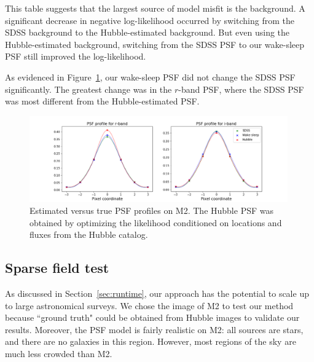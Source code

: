 This table suggests that the largest source of model misfit is the background. A significant decrease in negative log-likelihood occurred by switching from the SDSS background to the Hubble-estimated background. 
But even using the Hubble-estimated background, switching from the SDSS PSF to our wake-sleep PSF still improved the log-likelihood. 



As evidenced in Figure~\ref{fig:psf_profiles}, our wake-sleep PSF did not change the SDSS PSF significantly. The greatest change was in the $r$-band PSF, where the SDSS PSF was most different from the Hubble-estimated PSF. 

\begin{figure}[h]
    \centering
    \includegraphics[width=0.99\textwidth]{figures/psf_profiles.png}
    \caption{Estimated versus true PSF profiles on M2. The Hubble PSF was
    obtained by optimizing the likelihood conditioned on locations and fluxes
    from the Hubble catalog. }
    \label{fig:psf_profiles}
\end{figure}



\subsection{Sparse field test}
As discussed in Section~\ref{sec:runtime}, our approach has the potential 
to scale up to large astronomical surveys. We chose the image of M2 to test our method because ``ground truth" could be obtained from Hubble images to validate our results. Moreover, 
the PSF model is fairly realistic on M2: all sources are 
stars, and there are no galaxies in this region. 
However, most regions of the sky are much less 
crowded than M2.


